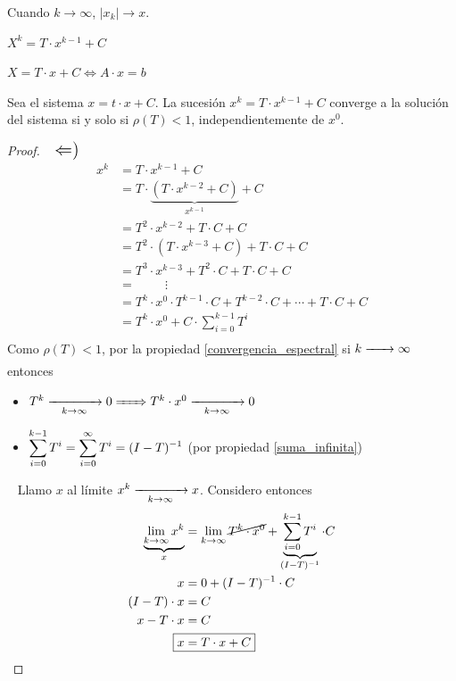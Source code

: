 \documentclass[]{article}
\begin{document}
Cuando $k\to\infty$, $|x_k|\to x$.

$X^k = T\cdot x^{k-1} + C$

$X = T\cdot x + C \Leftrightarrow A\cdot x = b$


\begin{prop}
	Sea el sistema $x = t\cdot x + C$. La sucesión $x^k = T\cdot x^{k-1}+C$ converge a la solución del sistema si y solo si $\rho(T) < 1$, independientemente de $x^0$.
	\begin{proof}
		~\newline
		$\mbox{\Large{$\Leftarrow$)}}$
		\begin{align*}
			x^k &= T\cdot x^{k-1} + C\\
			&= T\cdot \underbrace{(T\cdot x^{k-2}+C)}_{x^{k-1}} + C\\
			&= T^2\cdot x^{k-2} + T\cdot C + C\\
			&= T^2\cdot (T\cdot x^{k-3}+ C) + T\cdot C + C\\
			&= T^3\cdot x^{k-3} + T^2\cdot C + T\cdot C + C\\
			&= \hspace{1cm} \vdots\\
			&= T^k\cdot x^0\cdot T^{k-1}\cdot C + T^{k-2}\cdot C + \cdots + T\cdot C + C\\
			&= T^k\cdot x^0 + C\cdot \displaystyle \sum_{i=0}^{k-1}{T^i}\\
		\end{align*}
		Como $\rho(T) < 1$, por la propiedad \ref{convergencia_espectral} si $k\flecha{}\infty$ entonces
		\begin{itemize}
			\item $T^k\flecha{k\to\infty}0 \Flecha{} T^k\cdot x^0\flecha{k\to\infty}0$
			\item $\displaystyle \sum_{i=0}^{k-1}{T^i} = \sum_{i=0}^\infty{T^i} = (I-T)^{-1}\hfill$ (por propiedad \ref{suma_infinita})
		\end{itemize}

		~\newline
		Llamo $x$ al límite $x^k\xrightarrow[\hspace*{0.3cm} k\to\infty \hspace*{0.3cm}]{} x$. Considero entonces
		\begin{align*}
			\displaystyle \underbrace{\lim_{k\to\infty}{x^k}}_x &= \displaystyle \lim_{k\to\infty}{\cancel{T^k\cdot x^0} + \displaystyle \underbrace{\sum_{i=0}^{k-1}{T^i}}_{(I-T)^{-1}}\cdot C}\\
			x &= 0 + (I-T)^{-1}\cdot C\\
			(I-T)\cdot x &= C\\
			x-T\cdot x &= C\\
			\Aboxed{x &= T\cdot x + C}
		\end{align*}


\end{proof}
\end{prop}
\end{document}
